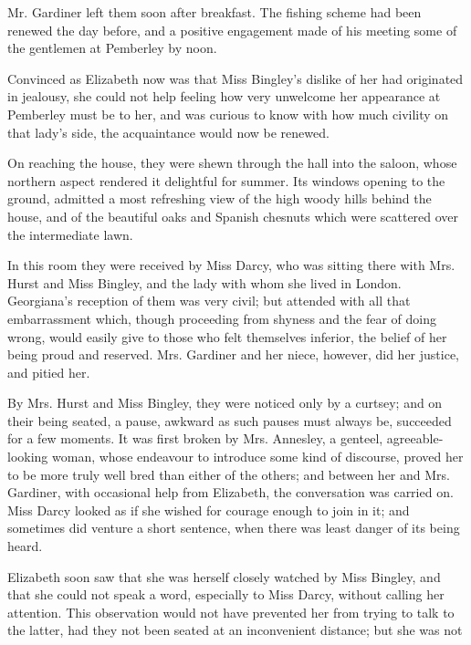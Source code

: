 Mr. Gardiner left them soon after breakfast. The fishing
scheme had been renewed the day before, and a positive
engagement made of his meeting some of the gentlemen at
Pemberley by noon.


Convinced as Elizabeth now was that Miss Bingley’s
dislike of her had originated in jealousy, she could not
help feeling how very unwelcome her appearance at
Pemberley must be to her, and was curious to know with
how much civility on that lady’s side, the acquaintance
would now be renewed.

On reaching the house, they were shewn through the
hall into the saloon, whose northern aspect rendered it
delightful for summer. Its windows opening to the ground,
admitted a most refreshing view of the high woody hills
behind the house, and of the beautiful oaks and Spanish
chesnuts which were scattered over the intermediate lawn.

In this room they were received by Miss Darcy, who
was sitting there with Mrs. Hurst and Miss Bingley, and
the lady with whom she lived in London. Georgiana’s
reception of them was very civil; but attended with all
that embarrassment which, though proceeding from shyness
and the fear of doing wrong, would easily give to
those who felt themselves inferior, the belief of her being
proud and reserved. Mrs. Gardiner and her niece, however,
did her justice, and pitied her.

By Mrs. Hurst and Miss Bingley, they were noticed only
by a curtsey; and on their being seated, a pause, awkward
as such pauses must always be, succeeded for a few
moments. It was first broken by Mrs. Annesley, a genteel,
agreeable-looking woman, whose endeavour to introduce
some kind of discourse, proved her to be more truly well
bred than either of the others; and between her and
Mrs. Gardiner, with occasional help from Elizabeth, the
conversation was carried on. Miss Darcy looked as if she
wished for courage enough to join in it; and sometimes
did venture a short sentence, when there was least danger
of its being heard.

Elizabeth soon saw that she was herself closely watched
by Miss Bingley, and that she could not speak a word,
especially to Miss Darcy, without calling her attention.
This observation would not have prevented her from
trying to talk to the latter, had they not been seated at
an inconvenient distance; but she was not sorry to be
spared the necessity of saying much. Her own thoughts
were employing her. She expected every moment that
some of the gentlemen would enter the room. She wished,
she feared that the master of the house might be amongst
them; and whether she wished or feared it most, she could
scarcely determine. After sitting in this manner a quarter
of an hour, without hearing Miss Bingley’s voice, Elizabeth
was roused by receiving from her a cold enquiry after the
health of her family. She answered with equal indifference
and brevity, and the other said no more.

